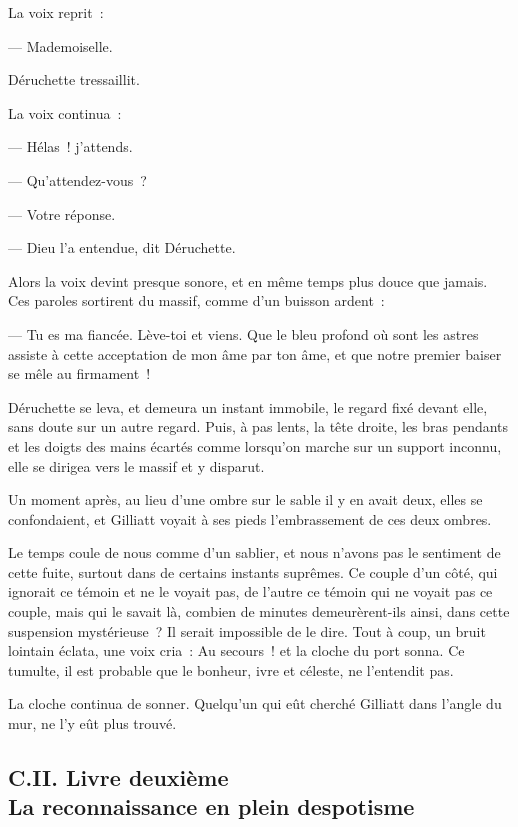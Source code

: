 \documentclass[french,twoside]{book} %
\begin{document}
La voix reprit :\par
— Mademoiselle.\par
 Déruchette tressaillit.\par
La voix continua :\par
— Hélas ! j’attends.\par
— Qu’attendez-vous ?\par
— Votre réponse.\par
— Dieu l’a entendue, dit Déruchette.\par
Alors la voix devint presque sonore, et en même temps plus douce que jamais. Ces paroles sortirent du massif, comme d’un buisson ardent :\par
— Tu es ma fiancée. Lève-toi et viens. Que le bleu profond où sont les astres assiste à cette acceptation de mon âme par ton âme, et que notre premier baiser se mêle au firmament !\par
Déruchette se leva, et demeura un instant immobile, le regard fixé devant elle, sans doute sur un autre regard. Puis, à pas lents, la tête droite, les bras pendants et les doigts des mains écartés comme lorsqu’on marche sur un support inconnu, elle se dirigea vers le massif et y disparut.\par
Un moment après, au lieu d’une ombre sur le sable il y en avait deux, elles se confondaient, et Gilliatt voyait à ses pieds l’embrassement de ces deux ombres.\par
Le temps coule de nous comme d’un sablier, et nous n’avons pas le sentiment de cette fuite, surtout dans de certains instants suprêmes. Ce couple d’un côté, qui ignorait ce témoin et ne le voyait pas, de l’autre ce témoin qui ne voyait pas ce couple, mais qui le savait là, combien de minutes demeurèrent-ils ainsi, dans cette suspension mystérieuse ? Il serait  impossible de le dire. Tout à coup, un bruit lointain éclata, une voix cria : Au secours ! et la cloche du port sonna. Ce tumulte, il est probable que le bonheur, ivre et céleste, ne l’entendit pas.\par
La cloche continua de sonner. Quelqu’un qui eût cherché Gilliatt dans l’angle du mur, ne l’y eût plus trouvé.\par
  \subsection[{C.II. Livre deuxième. La reconnaissance en plein despotisme}]{C.II. Livre deuxième \\
La reconnaissance en plein despotisme}
\end{document}
